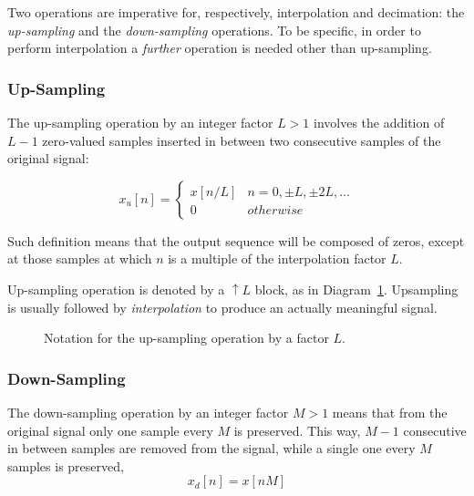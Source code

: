 \documentclass[\documentfontsize, twocolumn]{\classname}
\begin{document}
Two operations are imperative for, respectively, interpolation and decimation: the \emph{up-sampling} and the \emph{down-sam\-pling} operations. To be specific, in order to perform interpolation a \emph{further} operation is needed other than up-sampling.

\subsubsection{Up-Sampling}

The up-sampling operation by an integer factor $L > 1$ involves the addition of
$L-1$ zero-valued samples inserted in between two consecutive samples of the
original signal:

\begin{equation}\label{eqn:UpSampling}
	x_u[n] =
	\left\{
		\begin{array}{ll}
			x[n/L] 	& n=0,\pm L, \pm 2L, \dots \\
			0 	& otherwise
		\end{array}
	\right.
\end{equation}

Such definition means that the output sequence will be composed of zeros, except at those samples at which $n$ is a multiple of the interpolation factor $L$.

Up-sampling operation is denoted by a $\uparrow L$ block, as in Diagram~\ref{tikz:upsamplingOperation}. Upsampling is usually followed by \emph{interpolation} to produce an actually meaningful signal.

\begin{figure}[ht]
\begin{center}
    \caption{Notation for the up-sampling operation by a factor $L$.}\label{tikz:upsamplingOperation}
\end{center}
\end{figure}

\subsubsection{Down-Sampling}

The down-sampling operation by an integer factor $M > 1$ means that from the
original signal only one sample every $M$ is preserved. This way, $M-1$ consecutive
in between samples are removed from the signal, while a single one every $M$ samples is preserved,
\begin{equation}\label{eqn:DownSampling}
	x_d[n] = x[nM]
\end{equation}
\end{document}
